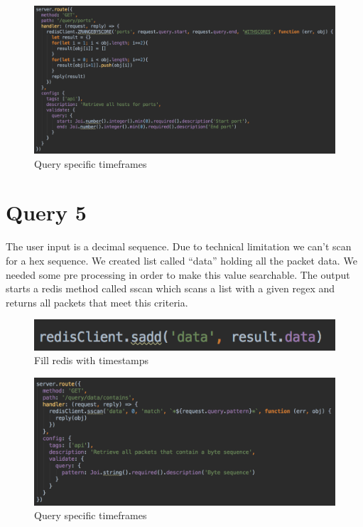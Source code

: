 \begin{figure}[htb!]
	\centerline{\includegraphics[width=1.0\textwidth]{resources/solution2-9.png}}
	\caption{Query specific timeframes}
	\label{query44}
\end{figure}

\section{Query 5}
The user input is a decimal sequence. Due to technical limitation we can’t scan for a hex sequence. We created list called “data” holding all the packet data. We needed some pre processing in order to make this value searchable. The output starts a redis method called sscan which scans a list with a given regex and returns all packets that meet this criteria.

  \begin{figure}[htb!]
	\centerline{\includegraphics[width=1.0\textwidth]{resources/solution2-10.png}}
	\caption{Fill redis with timestamps}
	\label{query5}
\end{figure}

\begin{figure}[htb!]
	\centerline{\includegraphics[width=1.0\textwidth]{resources/solution2-11.png}}
	\caption{Query specific timeframes}
	\label{query55}
\end{figure}

